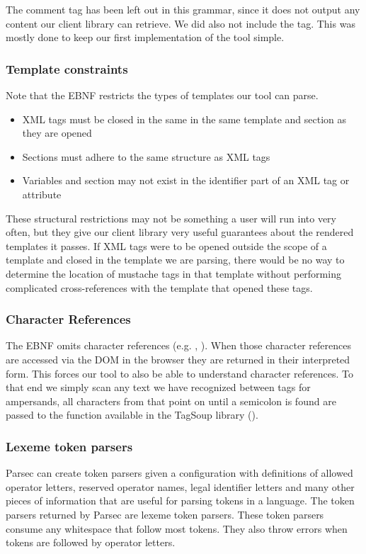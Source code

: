 The comment tag has been left out in this grammar, since it does not output any
content our client library can retrieve. We did also not include the
 tag. This was mostly done to keep our first
implementation of the tool simple.

\subsubsection{Template constraints}
Note that the EBNF restricts the types of
templates our tool can parse.

\begin{itemize}
\item XML tags must be closed in the same in the same template and section
      as they are opened
\item Sections must adhere to the same structure as XML tags
\item Variables and section may not exist in the identifier part of an XML tag
      or attribute
\end{itemize}

These structural restrictions may not be something a user will run into very
often, but they give our client library very useful guarantees about the
rendered templates it passes.
If XML tags were to be opened outside the scope of a template
and closed in the template we are parsing,
there would be no way to determine the location of mustache tags in
that template without performing complicated cross-references with the template
that opened these tags.

\subsubsection{Character References}
The EBNF omits character references (e.g. , ).
When those character references are accessed via the DOM in the browser they are
returned in their interpreted form. This forces our tool to also be able to
understand character references. To that end we simply scan any text we have
recognized between tags for ampersands, all characters from that point on until
a semicolon is found are passed to the  function available
in the TagSoup library ().

\subsubsection{Lexeme token parsers}
Parsec can create token parsers given a configuration with definitions of
allowed operator letters, reserved operator names,
legal identifier letters and many other pieces of information
that are useful for parsing tokens in a language.
The token parsers returned by Parsec are lexeme token parsers.
These token parsers consume any whitespace that follow most tokens.
They also throw errors when tokens are followed by operator letters.

